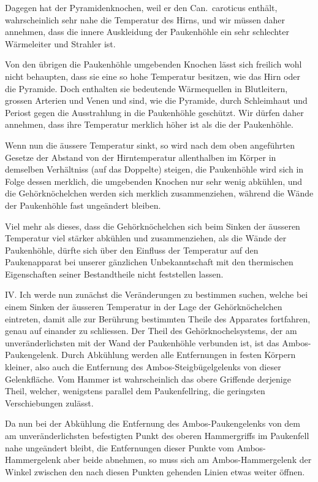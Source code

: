 \documentclass[12pt,a4paper]{article}
\begin{document}
Dagegen hat der Pyramidenknochen, weil er den Can.~caroticus enth\"alt, wahrscheinlich sehr nahe die Temperatur des Hirns, und wir m\"ussen daher annehmen, dass die innere Auskleidung der Paukenh\"ohle ein sehr schlechter W\"armeleiter und Strahler ist.

Von den \"ubrigen die Paukenh\"ohle umgebenden Knochen l\"asst sich freilich wohl nicht behaupten, dass sie eine so hohe Temperatur besitzen, wie das Hirn oder die Pyramide. Doch enthalten sie bedeutende W\"armequellen in Blutleitern, grossen Arterien und Venen und sind, wie die Pyramide, durch Schleimhaut und Periost gegen die Ausstrahlung in die Paukenh\"ohle gesch\"utzt. Wir d\"urfen daher annehmen, dass ihre Temperatur merklich h\"oher ist als die der Paukenh\"ohle.

Wenn nun die \"aussere Temperatur sinkt, so wird nach dem oben angef\"uhrten Gesetze der Abstand von der Hirntemperatur allenthalben im K\"orper in demselben Verh\"altniss (auf das Doppelte) steigen, die Paukenh\"ohle wird sich in Folge dessen merklich, die umgebenden Knochen nur sehr wenig abk\"uhlen, und die Geh\"orkn\"ochelchen werden sich merklich zusammenziehen, w\"ahrend die W\"ande der Paukenh\"ohle fast unge\"andert bleiben.

Viel mehr als dieses, dass die Geh\"orkn\"ochelchen sich beim Sinken der \"ausseren Temperatur viel st\"arker abk\"uhlen und zusammenziehen, als die W\"ande der Paukenh\"ohle, d\"urfte sich \"uber den Einfluss der Temperatur auf den Paukenapparat bei unserer g\"anzlichen Unbekanntschaft mit den thermischen Eigenschaften seiner Bestandtheile nicht feststellen lassen.

IV. Ich werde nun zun\"achst die Ver\"anderungen zu bestimmen suchen, welche bei einem Sinken der \"ausseren Temperatur in der Lage der Geh\"orkn\"ochelchen eintreten, damit alle zur Ber\"uhrung bestimmten Theile des Apparates fortfahren, genau auf einander zu schliessen. Der Theil des Geh\"orknochelsystems, der am unver\"anderlichsten mit der Wand der Paukenh\"ohle verbunden ist, ist das Ambos-Paukengelenk. Durch Abk\"uhlung werden alle Entfernungen in festen K\"orpern kleiner, also auch die Entfernung des Ambos-Steigb\"ugelgelenks von dieser Gelenkfl\"ache. Vom Hammer ist wahrscheinlich das obere Griffende derjenige Theil, welcher, wenigstens parallel dem Paukenfellring, die geringsten Verschiebungen zul\"asst.

Da nun bei der Abk\"uhlung die Entfernung des Ambos-Paukengelenks von dem am unver\"anderlichsten befestigten Punkt des oberen Hammergriffs im Paukenfell nahe unge\"andert bleibt, die Entfernungen dieser Punkte vom Ambos-Hammergelenk aber beide abnehmen, so muss sich am Ambos-Hammergelenk der Winkel zwischen den nach diesen Punkten gehenden Linien etwas weiter \"offnen.
\end{document}
